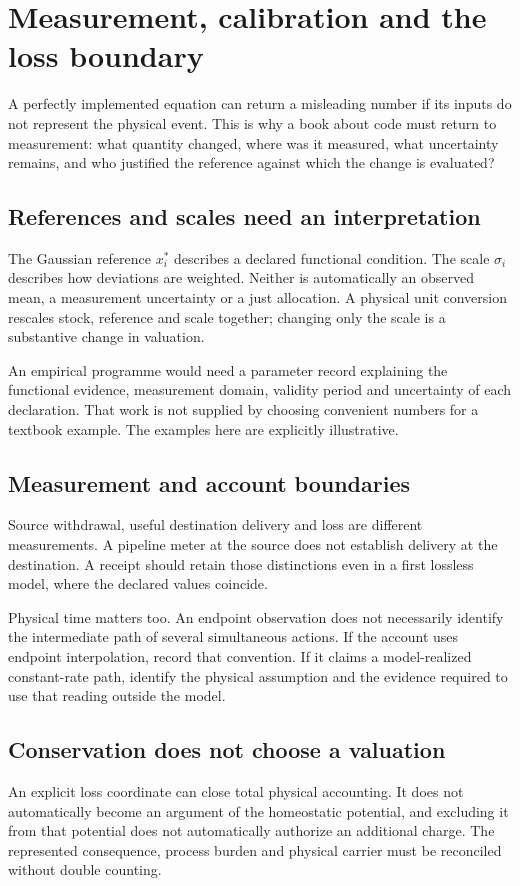 \chapter{Measurement, calibration and the loss boundary}\label{ch:measurement}
A perfectly implemented equation can return a misleading number if its
inputs do not represent the physical event. This is why a book about code
must return to measurement: what quantity changed, where was it measured,
what uncertainty remains, and who justified the reference against which
the change is evaluated?

\section{References and scales need an interpretation}
The Gaussian reference $x_i^*$ describes a declared functional condition.
The scale $\sigma_i$ describes how deviations are weighted. Neither is
automatically an observed mean, a measurement uncertainty or a just allocation.
A physical unit conversion rescales stock, reference and scale together;
changing only the scale is a substantive change in valuation.

An empirical programme would need a parameter record explaining the
functional evidence, measurement domain, validity period and uncertainty
of each declaration. That work is not supplied by choosing convenient
numbers for a textbook example. The examples here are explicitly illustrative.

\section{Measurement and account boundaries}
Source withdrawal, useful destination delivery and loss are different
measurements. A pipeline meter at the source does not establish delivery
at the destination. A receipt should retain those distinctions even in
a first lossless model, where the declared values coincide.

Physical time matters too. An endpoint observation does not necessarily
identify the intermediate path of several simultaneous actions. If the
account uses endpoint interpolation, record that convention. If it claims
a model-realized constant-rate path, identify the physical assumption and
the evidence required to use that reading outside the model.

\section{Conservation does not choose a valuation}
An explicit loss coordinate can close total physical accounting. It does
not automatically become an argument of the homeostatic potential, and
excluding it from that potential does not automatically authorize an
additional charge. The represented consequence, process burden and physical
carrier must be reconciled without double counting.


